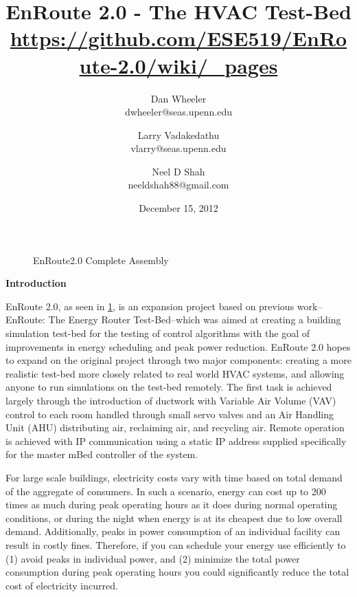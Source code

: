 \documentclass[a4paper,10pt,twocolumn]{article}
\begin{document}
\title{{\bf EnRoute 2.0 - The HVAC Test-Bed} \\ \normalsize\url{https://github.com/ESE519/EnRoute-2.0/wiki/_pages}}
\date{December 15, 2012}
\author{Dan Wheeler \\dwheeler@seas.upenn.edu
        \and Larry Vadakedathu \\vlarry@seas.upenn.edu
	\and Neel D Shah \\neeldshah88@gmail.com}
\maketitle

\begin{figure}[ht]
\centering
{}
\caption{EnRoute2.0 Complete Assembly}
\label{enroute2}
\end{figure}

\vspace{-5 mm}

\begin{center}
{\bf Introduction}
\end{center}

EnRoute 2.0, as seen in \ref{enroute2}, is an expansion project based on previous work--EnRoute:  The Energy Router Test-Bed--which was aimed at creating a building simulation test-bed for the testing of control algorithms with the goal of improvements in energy scheduling and peak power reduction.  EnRoute 2.0 hopes to expand on the original project through two major components:  creating a more realistic test-bed more closely related to real world HVAC systems, and allowing anyone to run simulations on the test-bed remotely.  The first task is achieved largely through the introduction of ductwork with Variable Air Volume (VAV) control to each room handled through small servo valves and an Air Handling Unit (AHU) distributing air, reclaiming air, and recycling air.  Remote operation is achieved with IP communication using a static IP address supplied specifically for the master mBed controller of the system.

For large scale buildings, electricity costs vary with time based on total demand of the aggregate of consumers.  In such a scenario, energy can cost up to 200 times as much during peak operating hours as it does during normal operating conditions, or during the night when energy is at its cheapest due to low overall demand.  Additionally, peaks in power consumption of an individual facility can result in costly fines.  Therefore, if you can schedule your energy use efficiently to (1) avoid peaks in individual power, and (2) minimize the total power consumption during peak operating hours you could significantly reduce the total cost of electricity incurred.
\end{document}
